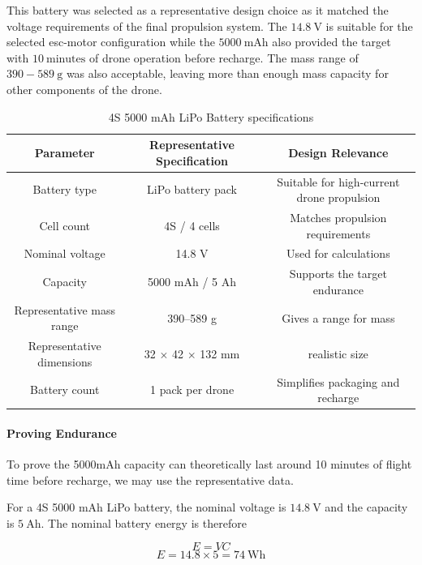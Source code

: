 \documentclass{report_template_oxford}
\begin{document}
This battery was selected as a representative design choice as it matched the voltage requirements of the final propulsion system. The \(14.8~\text{V}\) is suitable for the selected \gls{esc}-motor configuration while the \(5000~\text{mAh}\) also provided the target with \(10~\text{minutes}\) of drone operation before recharge. The mass range of \(390-589~\text{g}\) was also acceptable, leaving more than enough mass capacity for other components of the drone. 
\begin{table}[htbp]
\centering
\caption[4S 5000 mAh LiPo Battery specifications]{4S 5000 mAh LiPo Battery specifications\footnotemark}
\label{tab:battery_specifications}
\begin{tabular}{|c|c|c|}
\hline
\textbf{Parameter} & \textbf{Representative Specification} & \textbf{Design Relevance} \\
\hline
Battery type & LiPo battery pack & Suitable for high-current drone propulsion \\
\hline
Cell count & 4S / 4 cells & Matches propulsion requirements \\
\hline
Nominal voltage & 14.8 V & Used for calculations \\
\hline
Capacity & 5000 mAh / 5 Ah & Supports the target endurance \\
\hline
Representative mass range & 390--589 g & Gives a range for mass \\
\hline
Representative dimensions & 32 $\times$ 42 $\times$ 132 mm & realistic size \\
\hline
Battery count & 1 pack per drone & Simplifies packaging and recharge \\
\hline
\end{tabular}
\end{table}


\paragraph{Proving Endurance}

To prove the 5000mAh capacity can theoretically last around 10 minutes of flight time before recharge, we may use the representative data.

For a 4S 5000 mAh LiPo battery, the nominal voltage is \(14.8~\text{V}\) and the capacity is \(5~\text{Ah}\). The nominal battery energy is therefore

\begin{equation}
E=VC
\end{equation}
\[E= 14.8 \times 5 = 74~\text{Wh}\]
\end{document}
